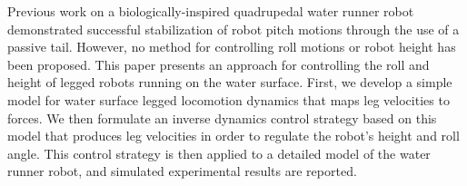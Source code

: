 Previous work on a biologically-inspired quadrupedal water runner robot demonstrated successful stabilization of robot pitch motions through the use of a passive tail. 
However, no method for controlling roll motions or robot height has been proposed. 
This paper presents an approach for controlling the roll and height of legged robots running on the water surface. 
First, we develop a simple model for water surface legged locomotion dynamics that maps leg velocities to forces. 
We then formulate an inverse dynamics control strategy based on this model that produces leg velocities in order to regulate the robot's height and roll angle. 
This control strategy is then applied to a detailed model of the water runner robot, and simulated experimental results are reported.
